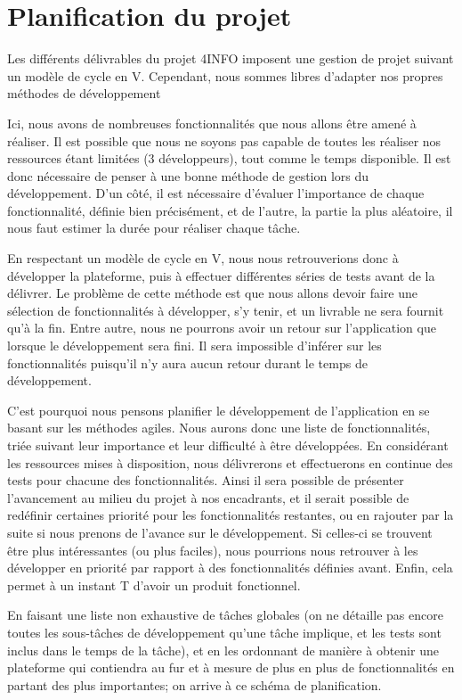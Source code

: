 \section{Planification du projet}
\label{sec:orga}

	Les différents délivrables du projet 4INFO imposent une gestion de projet suivant un modèle de cycle en V. Cependant, nous sommes libres d'adapter nos propres méthodes de développement 

	Ici, nous avons de nombreuses fonctionnalités que nous allons être amené à réaliser. Il est possible que nous ne soyons pas capable de toutes les réaliser nos ressources étant limitées (3 développeurs), tout comme le temps disponible. Il est donc nécessaire de penser à une bonne méthode de gestion lors du développement. D'un côté, il est nécessaire d'évaluer l'importance de chaque fonctionnalité, définie bien précisément, et de l'autre, la partie la plus aléatoire, il nous faut estimer la durée pour réaliser chaque tâche.

	En respectant un modèle de cycle en V, nous nous retrouverions donc à développer la plateforme, puis à effectuer différentes séries de tests avant de la délivrer. Le problème de cette méthode est que nous allons devoir faire une sélection de fonctionnalités à développer, s'y tenir, et un livrable ne sera fournit qu'à la fin. Entre autre, nous ne pourrons avoir un retour sur l'application que lorsque le développement sera fini. Il sera impossible d'inférer sur les fonctionnalités puisqu'il n'y aura aucun retour durant le temps de développement. 

	C'est pourquoi nous pensons planifier le développement de l'application en se basant sur les méthodes agiles. Nous aurons donc une liste de fonctionnalités, triée suivant leur importance et leur difficulté à être développées. En considérant les ressources mises à disposition, nous délivrerons et effectuerons en continue des tests pour chacune des fonctionnalités. Ainsi il sera possible de présenter l'avancement au milieu du projet à nos encadrants, et il serait possible de redéfinir certaines priorité pour les fonctionnalités restantes, ou en rajouter par la suite si nous prenons de l'avance sur le développement. Si celles-ci se trouvent être plus intéressantes (ou plus faciles), nous pourrions nous retrouver à les développer en priorité par rapport à des fonctionnalités définies avant. Enfin, cela permet à un instant T d'avoir un produit fonctionnel.

	En faisant une liste non exhaustive de tâches globales (on ne détaille pas encore toutes les sous-tâches de développement qu'une tâche implique, et les tests sont inclus dans le temps de la tâche), et en les ordonnant de manière à obtenir une plateforme qui contiendra au fur et à mesure de plus en plus de fonctionnalités en partant des plus importantes; on arrive à ce schéma de planification.

